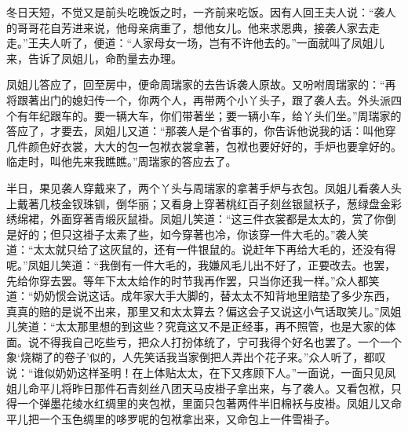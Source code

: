 \begin{parag}


    冬日天短，不觉又是前头吃晚饭之时，一齐前来吃饭。因有人回王夫人说：“袭人的哥哥花自芳进来说，他母亲病重了，想他女儿。他来求恩典，接袭人家去走走。”王夫人听了，便道：“人家母女一场，岂有不许他去的。”一面就叫了凤姐儿来，告诉了凤姐儿，命酌量去办理。
\end{parag}


\begin{parag}


    凤姐儿答应了，回至房中，便命周瑞家的去告诉袭人原故。又吩咐周瑞家的：“再将跟著出门的媳妇传一个，你两个人，再带两个小丫头子，跟了袭人去。外头派四个有年纪跟车的。要一辆大车，你们带著坐；要一辆小车，给丫头们坐。”周瑞家的答应了，才要去，凤姐儿又道：“那袭人是个省事的，你告诉他说我的话：叫他穿几件颜色好衣裳，大大的包一包袱衣裳拿著，包袱也要好好的，手炉也要拿好的。临走时，叫他先来我瞧瞧。”周瑞家的答应去了。
\end{parag}


\begin{parag}


    半日，果见袭人穿戴来了，两个丫头与周瑞家的拿著手炉与衣包。凤姐儿看袭人头上戴著几枝金钗珠钏，倒华丽；又看身上穿著桃红百子刻丝银鼠袄子，葱绿盘金彩绣绵裙，外面穿著青缎灰鼠褂。凤姐儿笑道：“这三件衣裳都是太太的，赏了你倒是好的；但只这褂子太素了些，如今穿著也冷，你该穿一件大毛的。”袭人笑道：“太太就只给了这灰鼠的，还有一件银鼠的。说赶年下再给大毛的，还没有得呢。”凤姐儿笑道：“我倒有一件大毛的，我嫌风毛儿出不好了，正要改去。也罢，先给你穿去罢。等年下太太给作的时节我再作罢，只当你还我一样。”众人都笑道：“奶奶惯会说这话。成年家大手大脚的，替太太不知背地里赔垫了多少东西，真真的赔的是说不出来，那里又和太太算去？偏这会子又说这小气话取笑儿。”凤姐儿笑道：“太太那里想的到这些？究竟这又不是正经事，再不照管，也是大家的体面。说不得我自己吃些亏，把众人打扮体统了，宁可我得个好名也罢了。一个一个象‘烧糊了的卷子’似的，人先笑话我当家倒把人弄出个花子来。”众人听了，都叹说：“谁似奶奶这样圣明！在上体贴太太，在下又疼顾下人。”一面说，一面只见凤姐儿命平儿将昨日那件石青刻丝八团天马皮褂子拿出来，与了袭人。又看包袱，只得一个弹墨花绫水红绸里的夹包袱，里面只包著两件半旧棉袄与皮褂。凤姐儿又命平儿把一个玉色绸里的哆罗呢的包袱拿出来，又命包上一件雪褂子。
\end{parag}


